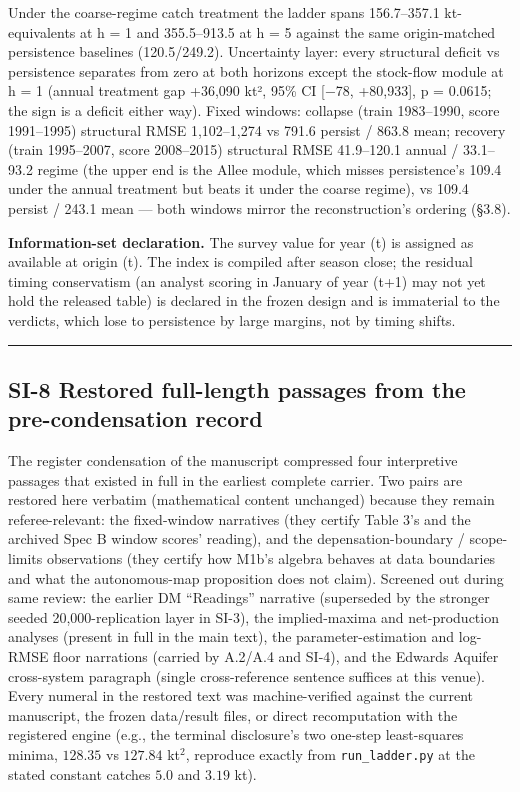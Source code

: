 \documentclass[11pt]{article}
\begin{document}
Under the coarse-regime catch treatment the ladder spans 156.7--357.1
kt-equivalents at h = 1 and 355.5--913.5 at h = 5 against the same
origin-matched persistence baselines (120.5/249.2). Uncertainty layer:
every structural deficit vs persistence separates from zero at both
horizons except the stock-flow module at h = 1 (annual treatment gap
+36,090 kt², 95\% CI {[}−78, +80,933{]}, p = 0.0615; the sign is a
deficit either way). Fixed windows: collapse (train 1983--1990, score
1991--1995) structural RMSE 1,102--1,274 vs 791.6 persist / 863.8 mean;
recovery (train 1995--2007, score 2008--2015) structural RMSE
41.9--120.1 annual / 33.1--93.2 regime (the upper end is the Allee
module, which misses persistence's 109.4 under the annual treatment but
beats it under the coarse regime), vs 109.4 persist / 243.1 mean ---
both windows mirror the reconstruction's ordering (§3.8).

\textbf{Information-set declaration.} The survey value for year (t) is
assigned as available at origin (t). The index is compiled after season
close; the residual timing conservatism (an analyst scoring in January
of year (t+1) may not yet hold the released table) is declared in the
frozen design and is immaterial to the verdicts, which lose to
persistence by large margins, not by timing shifts.

\begin{center}\rule{0.5\linewidth}{0.5pt}\end{center}

\subsection{SI-8 Restored full-length passages from the pre-condensation
record}\label{si-8-restored-full-length-passages-from-the-pre-condensation-record}

The register condensation of the manuscript compressed four interpretive
passages that existed in full in the earliest complete carrier. Two
pairs are restored here verbatim (mathematical content unchanged)
because they remain referee-relevant: the fixed-window narratives (they
certify Table 3's and the archived Spec B window scores' reading), and
the depensation-boundary / scope-limits observations (they certify how
M1b's algebra behaves at data boundaries and what the autonomous-map
proposition does not claim). Screened out during same review: the
earlier DM ``Readings'' narrative (superseded by the stronger seeded
20,000-replication layer in SI-3), the implied-maxima and net-production
analyses (present in full in the main text), the parameter-estimation
and log-RMSE floor narrations (carried by A.2/A.4 and SI-4), and the
Edwards Aquifer cross-system paragraph (single cross-reference sentence
suffices at this venue). Every numeral in the restored text was
machine-verified against the current manuscript, the frozen data/result
files, or direct recomputation with the registered engine (e.g., the
terminal disclosure's two one-step least-squares minima, \(128.35\) vs
\(127.84\) kt\(^2\), reproduce exactly from \texttt{run\_ladder.py} at
the stated constant catches \(5.0\) and \(3.19\) kt).
\end{document}
